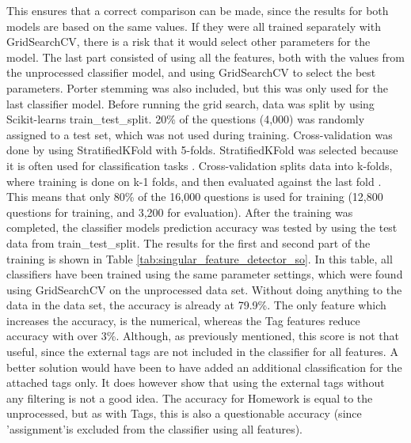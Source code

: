 This ensures that a correct comparison can be made, since the results for both models are based on the same values. 
If they were all trained separately with GridSearchCV, there is a risk that it would select other parameters for the model.
The last part consisted of using all the features, both with the values from the unprocessed classifier model, and using GridSearchCV to select the best parameters.
Porter stemming was also included, but this was only used for the last classifier model.
\vspace{0.5em}\newline
Before running the grid search, data was split by using Scikit-learns train\_test\_split.
20\% of the questions (4,000) was randomly assigned to a test set, which was not used during training. 
Cross-validation was done by using StratifiedKFold with 5-folds.
StratifiedKFold was selected because it is often used for classification tasks \cite{Kononenko2007}.
Cross-validation splits data into k-folds, where training is done on k-1 folds, and then evaluated against the last fold \cite{Bishop2006}.
This means that only 80\% of the 16,000 questions is used for training (12,800 questions for training, and 3,200 for evaluation).
After the training was completed, the classifier models prediction accuracy was tested by using the test data from train\_test\_split.
\vspace{0.5em}\newline
The results for the first and second part of the training is shown in Table \ref{tab:singular_feature_detector_so}.
In this table, all classifiers have been trained using the same parameter settings, which were found using GridSearchCV on the unprocessed data set.
Without doing anything to the data in the data set, the accuracy is already at 79.9\%. 
The only feature which increases the accuracy, is the numerical, whereas the Tag features reduce accuracy with over 3\%.
Although, as previously mentioned, this score is not that useful, since the external tags are not included in the classifier for all features. 
A better solution would have been to have added an additional classification  for the attached tags only. 
It does however show that using the external tags without any filtering is not a good idea.
The accuracy for Homework is equal to the unprocessed, but as with Tags, this is also a questionable accuracy (since 'assignment'is excluded from the classifier using all features). 
